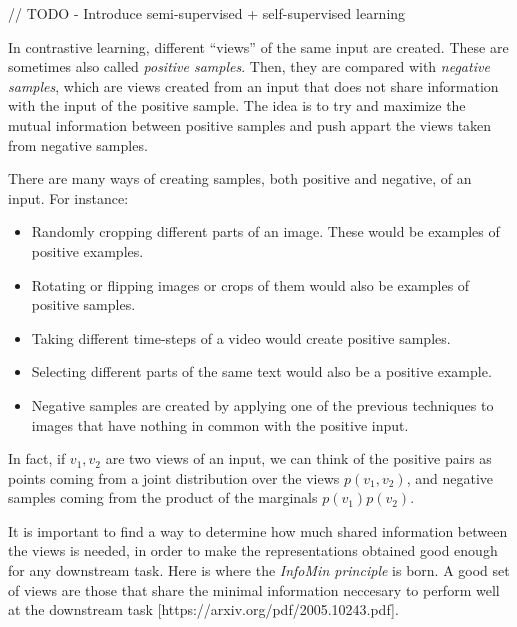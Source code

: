// TODO - Introduce semi-supervised + self-supervised learning

In contrastive learning, different ``views'' of the same input are created. These are sometimes also called \emph{positive samples}. Then, they are compared with \emph{negative samples}, which are views created from an input that does not share information with the input of the positive sample. The idea is to try and maximize the mutual information between positive samples and push appart the views taken from negative samples. 

There are many ways of creating samples, both positive and negative, of an input. For instance:
\begin{itemize}
    \item Randomly cropping different parts of an image. These would be examples of positive examples.
    \item Rotating or flipping images or crops of them would also be examples of positive samples.
    
    \item Taking different time-steps of a video would create positive samples.
    \item Selecting different parts of the same text would also be a positive example.    
    \item Negative samples are created by applying one of the previous techniques to images that have nothing in common with the positive input.
\end{itemize}

In fact, if $v_1,v_2$ are two views of an input, we can think of the positive pairs as points coming from a joint distribution over the views $p(v_1,v_2)$, and negative samples coming from the product of the marginals $p(v_1)p(v_2)$.

It is important to find a way to determine how much shared information between the views is needed, in order to make the representations obtained good enough for any downstream task. Here is where the \emph{InfoMin principle} is born. A good set of views are those that share the minimal information neccesary to perform well at the downstream task [https://arxiv.org/pdf/2005.10243.pdf]. 


